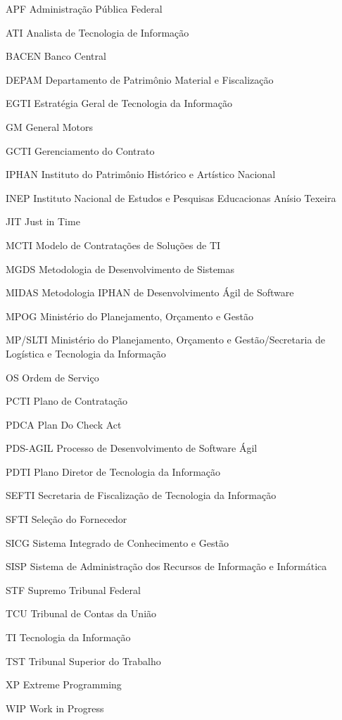 \begin{siglas}
 \item[APF] Administração Pública Federal
  \item[ATI] Analista de Tecnologia de Informação
  \item[BACEN] Banco Central
  \item[DEPAM] Departamento de Patrimônio Material e Fiscalização  
  \item[EGTI] Estratégia Geral de Tecnologia da Informação
  \item[GM] General Motors
  \item[GCTI] Gerenciamento do Contrato
  \item[IPHAN] Instituto do Patrimônio Histórico e Artístico Nacional
  \item[INEP] Instituto Nacional de Estudos e Pesquisas Educacionas Anísio Texeira
  \item[JIT] Just in Time
  \item[MCTI] Modelo de Contratações de Soluções de TI 
  \item[MGDS] Metodologia de Desenvolvimento de Sistemas
  \item[MIDAS] Metodologia IPHAN de Desenvolvimento Ágil de Software
  \item[MPOG] Ministério do Planejamento, Orçamento e Gestão
  \item[MP/SLTI] Ministério do Planejamento, Orçamento e Gestão/Secretaria de Logística e Tecnologia da Informação
  \item[OS] Ordem de Serviço
  \item[PCTI] Plano de Contratação
  \item[PDCA] Plan Do Check Act
  \item[PDS-AGIL] Processo de Desenvolvimento de Software Ágil
  \item[PDTI] Plano Diretor de Tecnologia da Informação
  \item[SEFTI] Secretaria de Fiscalização de Tecnologia da Informação
  \item[SFTI] Seleção do Fornecedor
  \item[SICG] Sistema Integrado de Conhecimento e Gestão
  \item[SISP] Sistema de Administração dos Recursos de Informação e Informática
  \item[STF] Supremo Tribunal Federal
  \item[TCU] Tribunal de Contas da União
  \item[TI] Tecnologia da Informação 
  \item[TST] Tribunal Superior do Trabalho
  \item[XP] Extreme Programming
  \item[WIP] Work in Progress
\end{siglas}
